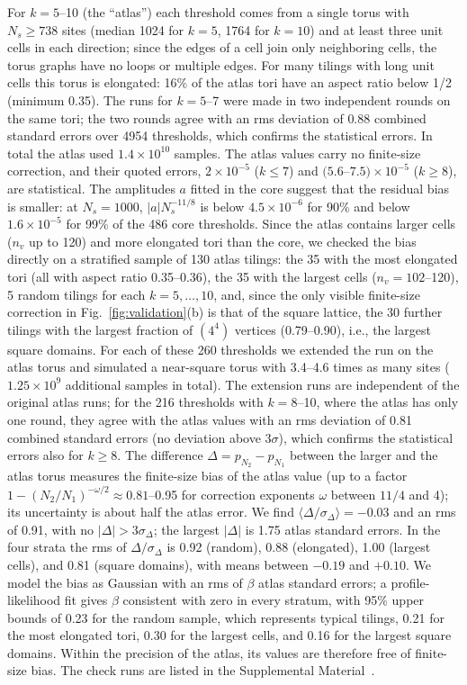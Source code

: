 \documentclass[pre,twocolumn,superscriptaddress,longbibliography,floatfix]{revtex4-2}
\begin{document}
For $k=5$--10 (the ``atlas'') each threshold comes from a single torus with $N_s\ge738$ sites (median 1024 for $k=5$, 1764 for $k=10$) and at least three unit cells in each direction; since the edges of a cell join only neighboring cells, the torus graphs have no loops or multiple edges. For many tilings with long unit cells this torus is elongated: 16\% of the atlas tori have an aspect ratio below 1/2 (minimum 0.35). The runs for $k=5$--7 were made in two independent rounds on the same tori; the two rounds agree with an rms deviation of $0.88$ combined standard errors over 4954 thresholds, which confirms the statistical errors. In total the atlas used $1.4\times10^{10}$ samples. The atlas values carry no finite-size correction, and their quoted errors, $2\times10^{-5}$ ($k\le7$) and $(5.6$--$7.5)\times10^{-5}$ ($k\ge8$), are statistical. The amplitudes $a$ fitted in the core suggest that the residual bias is smaller: at $N_s=1000$, $|a|N_s^{-11/8}$ is below $4.5\times10^{-6}$ for 90\% and below $1.6\times10^{-5}$ for 99\% of the 486 core thresholds. Since the atlas contains larger cells ($n_v$ up to 120) and more elongated tori than the core, we checked the bias directly on a stratified sample of 130 atlas tilings: the 35 with the most elongated tori (all with aspect ratio 0.35--0.36), the 35 with the largest cells ($n_v=102$--120), 5 random tilings for each $k=5,\dots,10$, and, since the only visible finite-size correction in Fig.~\ref{fig:validation}(b) is that of the square lattice, the 30 further tilings with the largest fraction of $(4^4)$ vertices (0.79--0.90), i.e., the largest square domains. For each of these 260 thresholds we extended the run on the atlas torus and simulated a near-square torus with 3.4--4.6 times as many sites ($1.25\times10^9$ additional samples in total). The extension runs are independent of the original atlas runs; for the 216 thresholds with $k=8$--10, where the atlas has only one round, they agree with the atlas values with an rms deviation of 0.81 combined standard errors (no deviation above $3\sigma$), which confirms the statistical errors also for $k\ge8$. The difference $\Delta=p_{N_2}-p_{N_1}$ between the larger and the atlas torus measures the finite-size bias of the atlas value (up to a factor $1-(N_2/N_1)^{-\omega/2}\approx0.81$--0.95 for correction exponents $\omega$ between $11/4$ and 4); its uncertainty is about half the atlas error. We find $\langle\Delta/\sigma_\Delta\rangle=-0.03$ and an rms of 0.91, with no $|\Delta|>3\sigma_\Delta$; the largest $|\Delta|$ is 1.75 atlas standard errors. In the four strata the rms of $\Delta/\sigma_\Delta$ is 0.92 (random), 0.88 (elongated), 1.00 (largest cells), and 0.81 (square domains), with means between $-0.19$ and $+0.10$. We model the bias as Gaussian with an rms of $\beta$ atlas standard errors; a profile-likelihood fit gives $\beta$ consistent with zero in every stratum, with 95\% upper bounds of 0.23 for the random sample, which represents typical tilings, 0.21 for the most elongated tori, 0.30 for the largest cells, and 0.16 for the largest square domains. Within the precision of the atlas, its values are therefore free of finite-size bias. The check runs are listed in the Supplemental Material~\cite{SM}.
\end{document}
